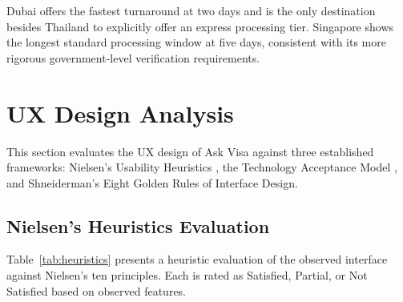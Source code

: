 \documentclass[journal, 10pt, twoside]{IEEEtran}
\begin{document}
Dubai offers the fastest turnaround at two days and is the only
destination besides Thailand to explicitly offer an express processing
tier. Singapore shows the longest standard processing window at five days,
consistent with its more rigorous government-level verification requirements.

\section{UX Design Analysis}
\label{sec:ux}

This section evaluates the UX design of Ask Visa against three established
frameworks: Nielsen's Usability Heuristics \cite{nielsen1994}, the
Technology Acceptance Model \cite{davis1989}, and Shneiderman's Eight
Golden Rules of Interface Design.

\subsection{Nielsen's Heuristics Evaluation}
\label{subsec:heuristics}
Table~\ref{tab:heuristics} presents a heuristic evaluation of the observed
interface against Nielsen's ten principles. Each is rated as Satisfied,
Partial, or Not Satisfied based on observed features.
\end{document}
